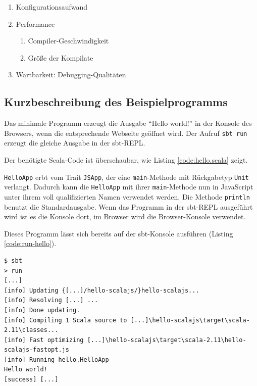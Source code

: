 \documentclass[a4paper, 12pt, hidelinks, listof=totoc, listoftables=totoc, bibliography=totoc]{scrreprt}
\begin{document}
\begin{enumerate}
	\item Konfigurationsaufwand
	\item Performance
	\begin{enumerate}
		\item Compiler-Geschwindigkeit
		\item Größe der Kompilate
	\end{enumerate}
	\item Wartbarkeit: Debugging-Qualitäten
\end{enumerate}

\subsection{Kurzbeschreibung des Beispielprogramms}

Das minimale Programm erzeugt die Ausgabe "`Hello world!"' in der Konsole des Browsers, wenn die entsprechende Webseite geöffnet wird. Der Aufruf \texttt{sbt run} erzeugt die gleiche Ausgabe in der sbt-REPL.

Der benötigte Scala-Code ist überschaubar, wie Listing \ref{code:hello.scala} zeigt.



\texttt{HelloApp} erbt vom Trait \texttt{JSApp}, der eine \texttt{main}-Methode mit Rückgabetyp \texttt{Unit} verlangt. Dadurch kann die \texttt{HelloApp} mit ihrer \texttt{main}-Methode nun in JavaScript unter ihrem voll qualifizierten Namen verwendet werden. Die Methode \texttt{println} benutzt die Standardausgabe. Wenn das Programm in der sbt-REPL ausgeführt wird ist es die Konsole dort, im Browser wird die Browser-Konsole verwendet.

Dieses Programm lässt sich bereits auf der sbt-Konsole ausführen (Listing \ref{code:run-hello}).

\begin{lstlisting}[caption={Lauf des Hallo-Welt-Programms in der sbt-REPL.}, label={code:run-hello}]
$ sbt
> run
[...]
[info] Updating {[...]/hello-scalajs/}hello-scalajs...
[info] Resolving [...] ...
[info] Done updating.
[info] Compiling 1 Scala source to [...]\hello-scalajs\target\scala-2.11\classes...
[info] Fast optimizing [...]\hello-scalajs\target\scala-2.11\hello-scalajs-fastopt.js
[info] Running hello.HelloApp
Hello world!
[success] [...]
\end{lstlisting}
\end{document}
